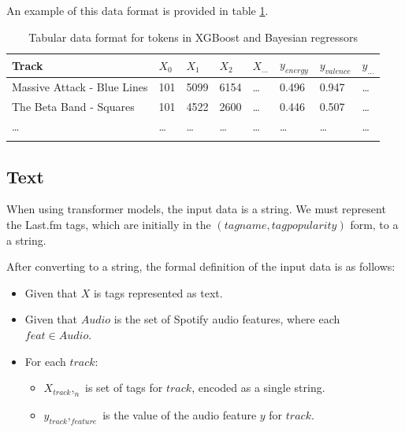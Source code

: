 \documentclass[sn-mathphys]{sn-jnl}%
\theoremstyle{thmstyleone}%
\theoremstyle{thmstyletwo}%
\theoremstyle{thmstylethree}%
\begin{document}
An example of this data format is provided in table \ref{tabular_token_format}.

\begin{table}[h]
      \begin{center}
      \begin{minipage}{\textwidth}
      \caption{Tabular data format for tokens in XGBoost and Bayesian regressors}\label{tabular_token_format}%
      \begin{tabular}{@{}llllllll@{}}
      \toprule
      Track                         & $X_{0}$ & $X_{1}$ & $X_{2}$ & $X_{\dots}$ & $y_{energy}$ & $y_{valence}$ & $y_{\dots}$ \\
      \midrule
      Massive Attack - Blue Lines   & 101     & 5099    & 6154    &  \dots      & 0.496        & 0.947         &  \dots  \\
      The Beta Band - Squares       & 101     & 4522    & 2600    &  \dots      & 0.446        & 0.507         &  \dots  \\
      \dots                         & \dots   & \dots   & \dots   &  \dots      & \dots        & \dots         &  \dots  \\
      \botrule
      \end{tabular}
      \end{minipage}
      \end{center}
\end{table}


\subsection{Text}

When using transformer models, the input data is a string.
We must represent the Last.fm tags, which are initially in the $(tag name, tag popularity)$ form, to a a string.

After converting to a string, the formal definition of the input data is as follows:

\begin{itemize}
      \item Given that $X$ is tags represented as text.
      \item Given that $Audio$ is the set of Spotify audio features, where each $feat \in Audio$.
      \item For each $track$:
      \begin{itemize}
            \item $X_{track},_{n}$ is set of tags for $track$, encoded as a single string.
            \item $y_{track},_{feature}$ is the value of the audio feature $y$ for $track$.
      \end{itemize}
\end{itemize}
\end{document}
